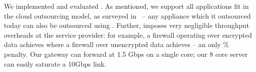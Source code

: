 We implemented and evaluated \sys. As mentioned, we support all applications fit in the cloud outsourcing model, as surveyed in~\cite{aplomb} -- any appliance which it outsourced today can also be outsourced using \sys.
Further, \sys imposes very negligible throughput overheads at the service provider: for example, a firewall operating over encrypted data achieves  where a firewall over unencrypted data achieves  -- an only \% penalty. Our gateway can forward at 1.5 Gbps on a single core; our 8 core server can easily saturate a 10Gbps link. 

